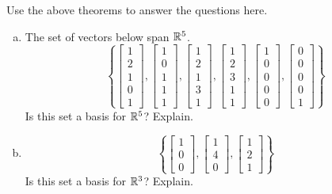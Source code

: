 \begin{exercise} %
	Use the above theorems to answer the questions here.
	\begin{multicols}{2}
		\begin{enumerate}[(a)]
			\item The set of vectors below span $\mathbb{R}^5$.
			$$\left\{
			\begin{bmatrix}1\\2\\1\\0\\1\end{bmatrix},
			\begin{bmatrix}1\\0\\1\\1\\1\end{bmatrix},
			\begin{bmatrix}1\\2\\1\\3\\1\end{bmatrix},
			\begin{bmatrix}1\\2\\3\\1\\1\end{bmatrix},
			\begin{bmatrix}1\\0\\0\\0\\0\end{bmatrix},
			\begin{bmatrix}0\\0\\0\\0\\1\end{bmatrix}
			\right\}$$
			Is this set a basis for $\mathbb{R}^5$? Explain.
			
			\columnbreak
			\item 
			$$\left\{
			\begin{bmatrix}1\\0\\0\end{bmatrix},
			\begin{bmatrix}1\\4\\0\end{bmatrix},
			\begin{bmatrix}1\\2\\1\end{bmatrix}
			\right\}$$
			Is this set a basis for $\mathbb{R}^3$? Explain.
		\end{enumerate}
	\end{multicols}
\end{exercise}
\vfill

\newpage
